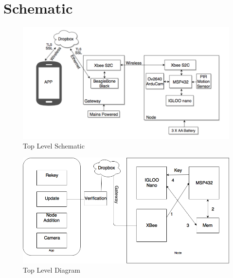 \documentclass[11pt]{article}
\begin{document}
\section*{Schematic}

\begin{figure}[!ht]
\centering
\includegraphics[scale = 0.6]{schematic1.png}
\caption{Top Level Schematic}
\end{figure}

\begin{figure}[!ht]
\centering
\includegraphics[scale = 0.6]{Diagram1.png}
\caption{Top Level Diagram}
\end{figure}
\end{document}
